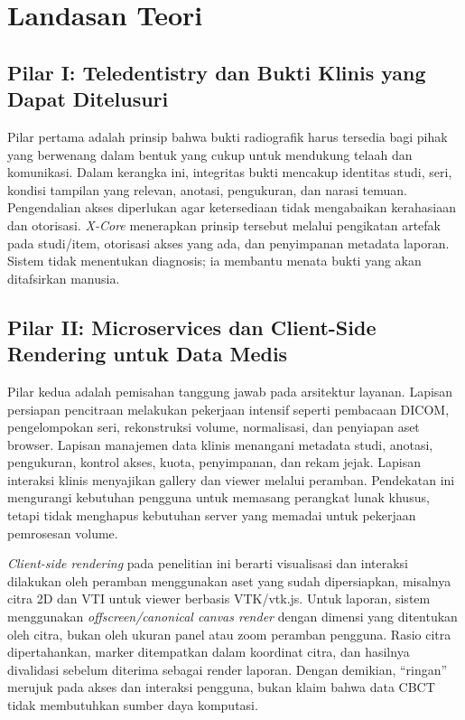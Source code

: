 \documentclass[12pt,a4paper,oneside]{report}
\newcommand{\xcore}{\textit{X-Core}}
\begin{document}
\section{Landasan Teori}

\subsection{Pilar I: Teledentistry dan Bukti Klinis yang Dapat Ditelusuri}

Pilar pertama adalah prinsip bahwa bukti radiografik harus tersedia bagi pihak yang berwenang dalam bentuk yang cukup untuk mendukung telaah dan komunikasi. Dalam kerangka ini, integritas bukti mencakup identitas studi, seri, kondisi tampilan yang relevan, anotasi, pengukuran, dan narasi temuan. Pengendalian akses diperlukan agar ketersediaan tidak mengabaikan kerahasiaan dan otorisasi. \xcore{} menerapkan prinsip tersebut melalui pengikatan artefak pada studi/item, otorisasi akses yang ada, dan penyimpanan metadata laporan. Sistem tidak menentukan diagnosis; ia membantu menata bukti yang akan ditafsirkan manusia.

\subsection{Pilar II: Microservices dan Client-Side Rendering untuk Data Medis}

Pilar kedua adalah pemisahan tanggung jawab pada arsitektur layanan. Lapisan persiapan pencitraan melakukan pekerjaan intensif seperti pembacaan DICOM, pengelompokan seri, rekonstruksi volume, normalisasi, dan penyiapan aset browser. Lapisan manajemen data klinis menangani metadata studi, anotasi, pengukuran, kontrol akses, kuota, penyimpanan, dan rekam jejak. Lapisan interaksi klinis menyajikan gallery dan viewer melalui peramban. Pendekatan ini mengurangi kebutuhan pengguna untuk memasang perangkat lunak khusus, tetapi tidak menghapus kebutuhan server yang memadai untuk pekerjaan pemrosesan volume.

\textit{Client-side rendering} pada penelitian ini berarti visualisasi dan interaksi dilakukan oleh peramban menggunakan aset yang sudah dipersiapkan, misalnya citra 2D dan VTI untuk viewer berbasis VTK/vtk.js. Untuk laporan, sistem menggunakan \textit{offscreen/canonical canvas render} dengan dimensi yang ditentukan oleh citra, bukan oleh ukuran panel atau zoom peramban pengguna. Rasio citra dipertahankan, marker ditempatkan dalam koordinat citra, dan hasilnya divalidasi sebelum diterima sebagai render laporan. Dengan demikian, ``ringan'' merujuk pada akses dan interaksi pengguna, bukan klaim bahwa data CBCT tidak membutuhkan sumber daya komputasi.
\end{document}
